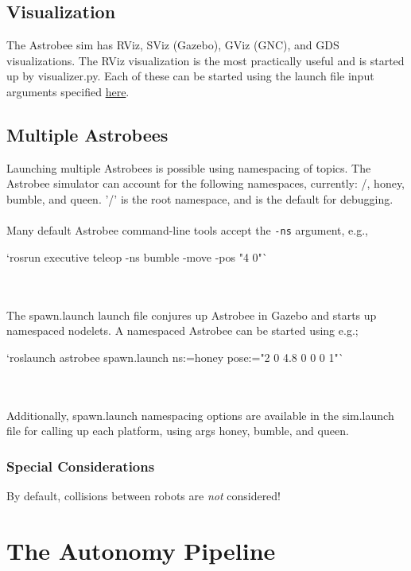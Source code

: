 \documentclass{article}
\begin{document}
\subsection{Visualization}

The Astrobee sim has RViz, SViz (Gazebo), GViz (GNC), and GDS visualizations. The RViz visualization is the most practically useful and is started up by visualizer.py. Each of these can be started using the launch file input arguments specified \href{https://github.com/nasa/astrobee/tree/master/simulation}{here}.
\\

\subsection{Multiple Astrobees}

Launching multiple Astrobees is possible using namespacing of topics. The Astrobee simulator can account for the following namespaces, currently: /, honey, bumble, and queen. '/' is the root namespace, and is the default for debugging.
\\\\
Many default Astrobee command-line tools accept the \texttt{-ns} argument, e.g.,\\
\begin{markdown}
`rosrun executive teleop -ns bumble -move -pos "4 0"`
\end{markdown}
\\\\
The spawn.launch launch file conjures up Astrobee in Gazebo and starts up namespaced nodelets. A namespaced Astrobee can be started using e.g.;\\
\begin{markdown}
`roslaunch astrobee spawn.launch ns:=honey pose:="2 0 4.8 0 0 0 1"`
\end{markdown}
\\\\
Additionally, spawn.launch namespacing options are available in the sim.launch file for calling up each platform, using args honey, bumble, and queen.

\subsubsection{Special Considerations}

By default, collisions between robots are \textit{not} considered!

\section{The Autonomy Pipeline}
\end{document}

